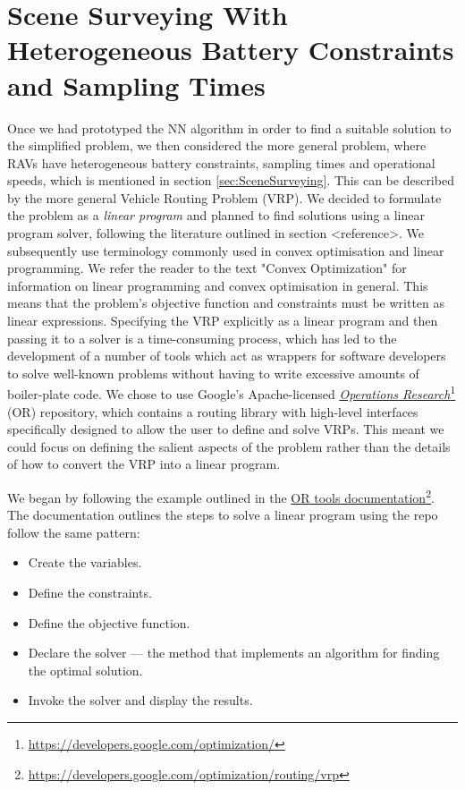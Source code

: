\section{Scene Surveying With Heterogeneous Battery Constraints and Sampling Times}

Once we had prototyped the NN algorithm in order to find a suitable solution to the simplified problem, we then considered the more general problem, where RAVs have heterogeneous battery constraints, sampling times and operational speeds, which is mentioned in section \ref{sec:SceneSurveying}. This can be described by the more general Vehicle Routing Problem (VRP). We decided to formulate the problem as a \textit{linear program} and planned to find solutions using a linear program solver, following the literature outlined in section <reference>. We subsequently use terminology commonly used in convex optimisation and linear programming. We refer the reader to the text "Convex Optimization" \cite{Boyd2004ConvexOptimization} for information on linear programming and convex optimisation in general. This means that the problem's objective function and constraints must be written as linear expressions.
Specifying the VRP explicitly as a linear program and then passing it to a solver is a time-consuming process, which has led to the development of a number of tools which act as wrappers for software developers to solve well-known problems without having to write excessive amounts of boiler-plate code. We chose to use Google's Apache-licensed \href{https://developers.google.com/optimization/}{\textit{Operations Research}}\footnote{\href {https://developers.google.com/optimization/}{https://developers.google.com/optimization/}} (OR) repository, which contains a routing library with high-level interfaces specifically designed to allow the user to define and solve VRPs. This meant we could focus on defining the salient aspects of the problem rather than the details of how to convert the VRP into a linear program.

We began by following the example outlined in the \href{https://developers.google.com/optimization/routing/vrp}{OR tools documentation}\footnote{\href {https://developers.google.com/optimization/routing/vrp}{https://developers.google.com/optimization/routing/vrp}}. The documentation outlines the steps to solve a linear program using the repo follow the same pattern: 
\begin{itemize}
\item Create the variables.
\item Define the constraints.
\item Define the objective function.
\item Declare the solver — the method that implements an algorithm for finding the optimal solution.
\item Invoke the solver and display the results.
\end{itemize}

